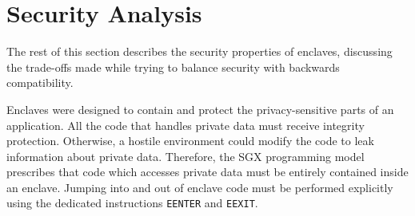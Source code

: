 \section{Security Analysis}
\label{sec:security}

The rest of this section describes the security properties of
enclaves, discussing the trade-offs made while trying to balance security with
backwards compatibility.



%
%







Enclaves were designed to contain and protect the privacy-sensitive parts of an
application. All the code that handles private data must receive integrity
protection. Otherwise, a hostile environment could modify the code to leak
information about private data. Therefore, the SGX programming model prescribes
that code which accesses private data must be entirely contained inside an
enclave. Jumping into and out of enclave code must be performed explicitly
using the dedicated instructions \texttt{EENTER} and \texttt{EEXIT}.


%



